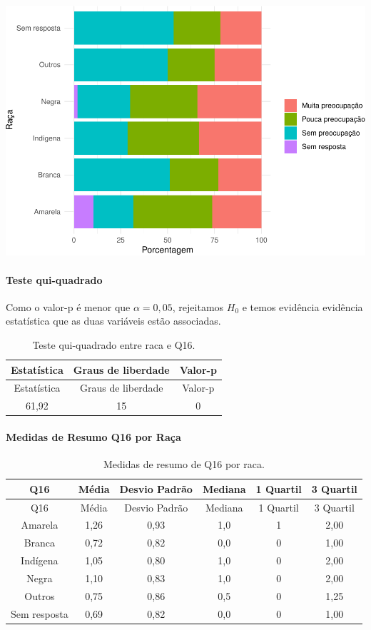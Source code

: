 \documentclass[]{article}
\let\oldparagraph\paragraph
\renewcommand{\paragraph}[1]{\oldparagraph{#1}\mbox{}}
\begin{document}
\begin{center}\includegraphics[width=0.75\linewidth]{relatorio_files/figure-latex/unnamed-chunk-158-1} \end{center}

\hypertarget{teste-qui-quadrado-15}{%
\paragraph{Teste qui-quadrado}\label{teste-qui-quadrado-15}}

Como o valor-p é menor que \(\alpha=0,05\), rejeitamos \(H_0\) e temos evidência evidência estatística que as duas variáveis estão associadas.

\begin{longtable}[]{@{}ccc@{}}
\caption{\label{tab:unnamed-chunk-159}Teste qui-quadrado entre raca e Q16.}\tabularnewline
\toprule
Estatística & Graus de liberdade & Valor-p\tabularnewline
\midrule
\endfirsthead
\toprule
Estatística & Graus de liberdade & Valor-p\tabularnewline
\midrule
\endhead
61,92 & 15 & 0\tabularnewline
\bottomrule
\end{longtable}

\cleardoublepage

\hypertarget{medidas-de-resumo-q16-por-rauxe7a}{%
\paragraph{Medidas de Resumo Q16 por Raça}\label{medidas-de-resumo-q16-por-rauxe7a}}

\begin{longtable}[]{@{}cccccc@{}}
\caption{\label{tab:unnamed-chunk-160}Medidas de resumo de Q16 por raca.}\tabularnewline
\toprule
Q16 & Média & Desvio Padrão & Mediana & 1 Quartil & 3 Quartil\tabularnewline
\midrule
\endfirsthead
\toprule
Q16 & Média & Desvio Padrão & Mediana & 1 Quartil & 3 Quartil\tabularnewline
\midrule
\endhead
Amarela & 1,26 & 0,93 & 1,0 & 1 & 2,00\tabularnewline
Branca & 0,72 & 0,82 & 0,0 & 0 & 1,00\tabularnewline
Indígena & 1,05 & 0,80 & 1,0 & 0 & 2,00\tabularnewline
Negra & 1,10 & 0,83 & 1,0 & 0 & 2,00\tabularnewline
Outros & 0,75 & 0,86 & 0,5 & 0 & 1,25\tabularnewline
Sem resposta & 0,69 & 0,82 & 0,0 & 0 & 1,00\tabularnewline
\bottomrule
\end{longtable}
\end{document}
